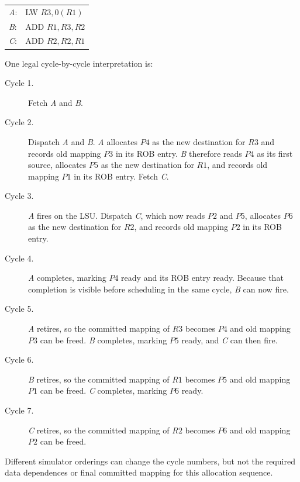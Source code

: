     {\small
\begin{center}
    \begin{tabular}{@{}ll@{}}
        \textit{A}: & LW $R3,0(R1)$  \\
        \textit{B}: & ADD $R1,R3,R2$ \\
        \textit{C}: & ADD $R2,R2,R1$
    \end{tabular}
\end{center}}

One legal cycle-by-cycle interpretation is:
\begin{description}
    \item[Cycle 1.] Fetch \textit{A} and \textit{B}.
    \item[Cycle 2.] Dispatch \textit{A} and \textit{B}. \textit{A} allocates $P4$ as the new destination for $R3$ and records old mapping $P3$ in its ROB entry. \textit{B} therefore reads $P4$ as its first source, allocates $P5$ as the new destination for $R1$, and records old mapping $P1$ in its ROB entry.
    Fetch \textit{C}.
    \item[Cycle 3.] \textit{A} fires on the LSU. Dispatch \textit{C}, which now reads $P2$ and $P5$, allocates $P6$ as the new destination for $R2$, and records old mapping $P2$ in its ROB entry.
    \item[Cycle 4.] \textit{A} completes, marking $P4$ ready and its ROB entry ready.
    Because that completion is visible before scheduling in the same cycle, \textit{B} can now fire.
    \item[Cycle 5.] \textit{A} retires, so the committed mapping of $R3$ becomes $P4$ and old mapping $P3$ can be freed. \textit{B} completes, marking $P5$ ready, and \textit{C} can then fire.
    \item[Cycle 6.] \textit{B} retires, so the committed mapping of $R1$ becomes $P5$ and old mapping $P1$ can be freed. \textit{C} completes, marking $P6$ ready.
    \item[Cycle 7.] \textit{C} retires, so the committed mapping of $R2$ becomes $P6$ and old mapping $P2$ can be freed.
\end{description}

Different simulator orderings can change the cycle numbers, but not the required data dependences or final committed mapping for this allocation sequence.

